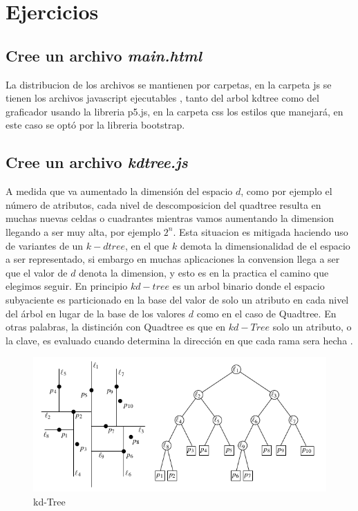 \documentclass{article}
\begin{document}
	
	\section{Ejercicios}\label{sec:ejercicios}
	
	    \subsection{Cree un archivo \textit{main.html}} 
		
		
		
		La distribucion de los archivos se mantienen por carpetas, en la carpeta js se tienen los archivos javascript ejecutables , tanto del arbol kdtree como del graficador usando la libreria p5.js, en la carpeta css los estilos que manejará, en este caso se optó por la libreria bootstrap. 
		
		
		\subsection{Cree un archivo \textit{kdtree.js}} 
		
		A medida que va aumentado la dimensión del espacio $d$, como por ejemplo el número de atributos, cada nivel de descomposicion del quadtree resulta en muchas nuevas celdas o cuadrantes mientras vamos aumentando la dimension llegando a ser muy alta, por ejemplo $2^n$. Esta situacion es mitigada haciendo uso de variantes de un $k-d tree$, en el que $k$ demota la dimensionalidad de el espacio a ser representado, si embargo en muchas aplicaciones la convension llega a ser que el valor de $d$ denota la dimension, y esto es en la practica el camino que elegimos seguir. En principio $kd-tree$ es un arbol binario donde el espacio subyaciente es particionado en la base del valor de solo un atributo en cada nivel del árbol en lugar de la base de los valores $d$ como en el caso de Quadtree. En otras palabras, la distinción con Quadtree es que en $kd-Tree$ solo un atributo, o la clave, es evaluado cuando determina la dirección en que cada rama sera hecha  \cite{Morgan2006}.
        
        \begin{figure}[H]
			\centering
			\includegraphics[scale=0.40]{img/kdtree1.png}
			\caption{kd-Tree  \cite{compgeom:2000}}
			\label{fig:kdtree1}
		\end{figure}		
		
\end{document}
